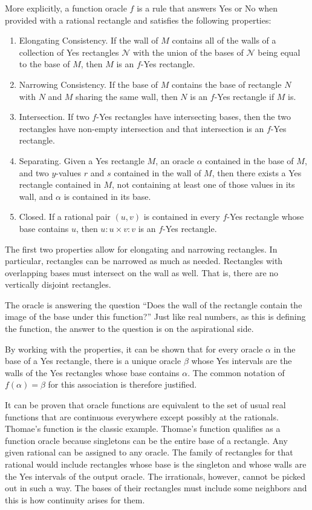 \documentclass[12pt]{article}
\begin{document}
More explicitly, a function oracle $f$ is a rule that answers Yes or No when provided with a rational rectangle and satisfies the following properties: 
\begin{enumerate}
    \item Elongating Consistency. If the wall of $M$ contains all of the walls of a collection of Yes rectangles $\mathcal{N}$ with the union of the bases of $\mathcal{N}$ being equal to the base of $M$, then $M$ is an $f$-Yes rectangle.
    \item Narrowing Consistency. If the base of  $M$ contains the base of rectangle $N$ with $N$ and $M$ sharing the same wall, then $N$ is an $f$-Yes rectangle if $M$ is.  
    \item Intersection. If two $f$-Yes rectangles have intersecting bases, then the two rectangles have non-empty intersection and that intersection is an $f$-Yes rectangle. 
    \item Separating. Given a Yes rectangle $M$, an oracle $\alpha$ contained in the base of $M$, and two $y$-values $r$ and $s$ contained in the wall of $M$, then there exists a Yes rectangle contained in $M$, not containing at least one of those values in its wall, and $\alpha$ is contained in its base.
    \item Closed. If a rational pair $(u,v)$ is contained in every $f$-Yes rectangle whose base contains $u$, then $u:u \times v:v$ is an $f$-Yes rectangle. 
\end{enumerate} 


The first two properties allow for elongating and narrowing rectangles. In particular, rectangles can be narrowed as much as needed. Rectangles with overlapping bases must intersect on the wall as well. That is, there are no vertically disjoint rectangles. 

The oracle is answering the question ``Does the wall of the rectangle contain the image of the base under this function?'' Just like real numbers, as this is defining the function, the answer to the question is on the aspirational side. 

By working with the properties, it can be shown that for every oracle $\alpha$ in the base of a Yes rectangle, there is a unique oracle $\beta$ whose Yes intervals are the walls of the Yes rectangles whose base contains $\alpha$. The common notation of $f(\alpha) = \beta$ for this association is therefore justified. 

It can be proven that oracle functions are equivalent to the set of usual real functions that are continuous everywhere except possibly at the rationals. Thomae's function is the classic example. Thomae's function qualifies as a function oracle because singletons can be the entire base of a rectangle. Any given rational can be assigned to any oracle. The family of rectangles for that rational would include rectangles whose base is the singleton and whose walls are the Yes intervals of the output oracle. The irrationals, however, cannot be picked out in such a way. The bases of their rectangles must include some neighbors and this is how continuity arises for them.
\end{document}
